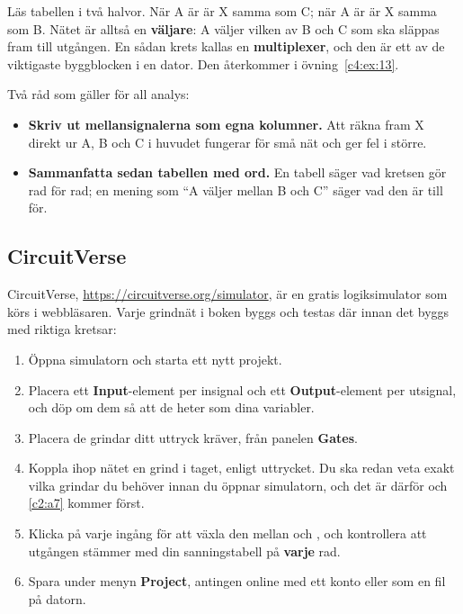\noindent Läs tabellen i två halvor. När A är  är X samma som C; när A är  är X
samma som B. Nätet är alltså en \textbf{väljare}: A väljer vilken av B och C som ska släppas fram
till utgången. En sådan krets kallas en \textbf{multiplexer}, och den är ett av de viktigaste
byggblocken i en dator. Den återkommer i övning~\ref{c4:ex:13}.

Två råd som gäller för all analys:
\begin{itemize}
  \item \textbf{Skriv ut mellansignalerna som egna kolumner.} Att räkna fram X direkt ur A, B och
    C i huvudet fungerar för små nät och ger fel i större.
  \item \textbf{Sammanfatta sedan tabellen med ord.} En tabell säger vad kretsen gör rad för rad;
    en mening som \enquote{A väljer mellan B och C} säger vad den är till för.
\end{itemize}

\subsection{CircuitVerse}
\label{c2:a9}
CircuitVerse, \url{https://circuitverse.org/simulator}, är en gratis logiksimulator som körs i
webbläsaren. Varje grindnät i boken byggs och testas där innan det byggs med riktiga kretsar:
\begin{enumerate}
  \item Öppna simulatorn och starta ett nytt projekt.
  \item Placera ett \textbf{Input}-element per insignal och ett \textbf{Output}-element per
    utsignal, och döp om dem så att de heter som dina variabler.
  \item Placera de grindar ditt uttryck kräver, från panelen \textbf{Gates}.
  \item Koppla ihop nätet en grind i taget, enligt uttrycket. Du ska redan veta exakt vilka grindar
    du behöver innan du öppnar simulatorn, och det är därför  och \ref{c2:a7} kommer
    först.
  \item Klicka på varje ingång för att växla den mellan  och , och kontrollera att
    utgången stämmer med din sanningstabell på \textbf{varje} rad.
  \item Spara under menyn \textbf{Project}, antingen online med ett konto eller som en fil på
    datorn.
\end{enumerate}

